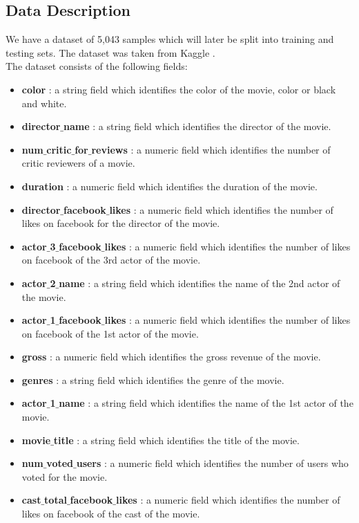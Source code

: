 \documentclass[conference]{IEEEtran}
\begin{document}
\subsection{Data Description}
We have a dataset of 5,043 samples which will later be split into training and testing sets. The dataset was taken from Kaggle \cite{data}.\\
The dataset consists of the following fields:
\begin{itemize}
	\item \textbf{color} : a string field which identifies the color of the movie, color or black and white.
	\item \textbf{director$\_$name} : a string field which identifies the director of the movie.
	\item \textbf{num$\_$critic$\_$for$\_$reviews} : a numeric field which identifies the number of critic reviewers of a movie.
	\item \textbf{duration} : a numeric field which identifies the duration of the movie.
	\item \textbf{director$\_$facebook$\_$likes} : a numeric field which identifies the number of likes on facebook for the director of the movie.
	\item \textbf{actor$\_$3$\_$facebook$\_$likes} : a numeric field which identifies the number of likes on facebook of the 3rd actor of the movie.
	\item \textbf{actor$\_$2$\_$name} : a string field which identifies the name of the 2nd actor of the movie.
	\item \textbf{actor$\_$1$\_$facebook$\_$likes} : a numeric field which identifies the number of likes on facebook of the 1st actor of the movie.
	\item \textbf{gross} : a numeric field which identifies the gross revenue of the movie. 
	\item \textbf{genres}  : a string field which identifies the genre of the movie. 
	\item \textbf{actor$\_$1$\_$name} : a string field which identifies the name of the 1st actor of the movie.
	\item \textbf{movie$\_$title} : a string field which identifies the title of the movie.
	\item \textbf{num$\_$voted$\_$users} : a numeric field which identifies the number of users who voted for the movie. 
	\item \textbf{cast$\_$total$\_$facebook$\_$likes} : a numeric field which identifies the number of likes on facebook of the cast of the movie.

\end{itemize}
\end{document}
